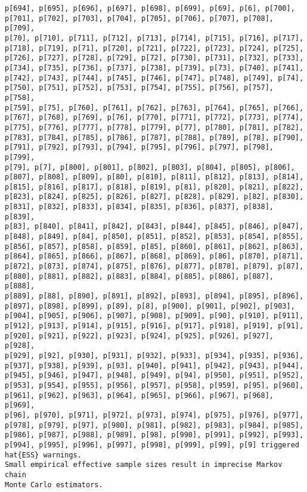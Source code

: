 \documentclass[
  letterpaper,
  DIV=11,
  numbers=noendperiod]{scrartcl}
\begin{document}
\begin{verbatim}
p[694], p[695], p[696], p[697], p[698], p[699], p[69], p[6], p[700],
p[701], p[702], p[703], p[704], p[705], p[706], p[707], p[708], p[709],
p[70], p[710], p[711], p[712], p[713], p[714], p[715], p[716], p[717],
p[718], p[719], p[71], p[720], p[721], p[722], p[723], p[724], p[725],
p[726], p[727], p[728], p[729], p[72], p[730], p[731], p[732], p[733],
p[734], p[735], p[736], p[737], p[738], p[739], p[73], p[740], p[741],
p[742], p[743], p[744], p[745], p[746], p[747], p[748], p[749], p[74],
p[750], p[751], p[752], p[753], p[754], p[755], p[756], p[757], p[758],
p[759], p[75], p[760], p[761], p[762], p[763], p[764], p[765], p[766],
p[767], p[768], p[769], p[76], p[770], p[771], p[772], p[773], p[774],
p[775], p[776], p[777], p[778], p[779], p[77], p[780], p[781], p[782],
p[783], p[784], p[785], p[786], p[787], p[788], p[789], p[78], p[790],
p[791], p[792], p[793], p[794], p[795], p[796], p[797], p[798], p[799],
p[79], p[7], p[800], p[801], p[802], p[803], p[804], p[805], p[806],
p[807], p[808], p[809], p[80], p[810], p[811], p[812], p[813], p[814],
p[815], p[816], p[817], p[818], p[819], p[81], p[820], p[821], p[822],
p[823], p[824], p[825], p[826], p[827], p[828], p[829], p[82], p[830],
p[831], p[832], p[833], p[834], p[835], p[836], p[837], p[838], p[839],
p[83], p[840], p[841], p[842], p[843], p[844], p[845], p[846], p[847],
p[848], p[849], p[84], p[850], p[851], p[852], p[853], p[854], p[855],
p[856], p[857], p[858], p[859], p[85], p[860], p[861], p[862], p[863],
p[864], p[865], p[866], p[867], p[868], p[869], p[86], p[870], p[871],
p[872], p[873], p[874], p[875], p[876], p[877], p[878], p[879], p[87],
p[880], p[881], p[882], p[883], p[884], p[885], p[886], p[887], p[888],
p[889], p[88], p[890], p[891], p[892], p[893], p[894], p[895], p[896],
p[897], p[898], p[899], p[89], p[8], p[900], p[901], p[902], p[903],
p[904], p[905], p[906], p[907], p[908], p[909], p[90], p[910], p[911],
p[912], p[913], p[914], p[915], p[916], p[917], p[918], p[919], p[91],
p[920], p[921], p[922], p[923], p[924], p[925], p[926], p[927], p[928],
p[929], p[92], p[930], p[931], p[932], p[933], p[934], p[935], p[936],
p[937], p[938], p[939], p[93], p[940], p[941], p[942], p[943], p[944],
p[945], p[946], p[947], p[948], p[949], p[94], p[950], p[951], p[952],
p[953], p[954], p[955], p[956], p[957], p[958], p[959], p[95], p[960],
p[961], p[962], p[963], p[964], p[965], p[966], p[967], p[968], p[969],
p[96], p[970], p[971], p[972], p[973], p[974], p[975], p[976], p[977],
p[978], p[979], p[97], p[980], p[981], p[982], p[983], p[984], p[985],
p[986], p[987], p[988], p[989], p[98], p[990], p[991], p[992], p[993],
p[994], p[995], p[996], p[997], p[998], p[999], p[99], p[9] triggered
hat{ESS} warnings.
Small empirical effective sample sizes result in imprecise Markov chain
Monte Carlo estimators.
 
\end{verbatim}
\end{document}
